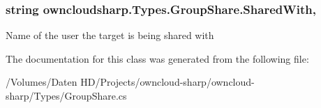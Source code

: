 \subsubsection[{Shared\+With}]{\setlength{\rightskip}{0pt plus 5cm}string owncloudsharp.\+Types.\+Group\+Share.\+Shared\+With\hspace{0.3cm}{\ttfamily [get]}, {\ttfamily [set]}}\label{classowncloudsharp_1_1_types_1_1_group_share_a6b51436f6f51780137ff9640b15d9e9c}


Name of the user the target is being shared with 



The documentation for this class was generated from the following file\+:\begin{DoxyCompactItemize}
\item 
/\+Volumes/\+Daten H\+D/\+Projects/owncloud-\/sharp/owncloud-\/sharp/\+Types/Group\+Share.\+cs\end{DoxyCompactItemize}
